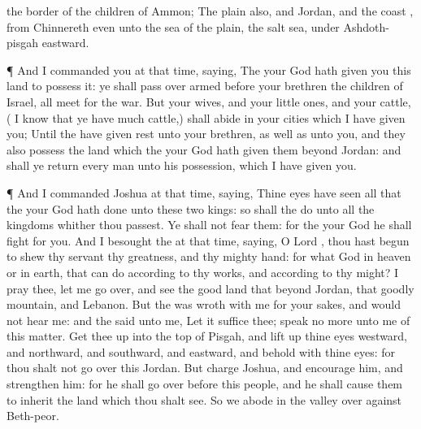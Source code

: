{{} the
border of the
children of
Ammon;
The
plain also, and
Jordan, and the
coast
{}, from
Chinnereth even unto the
sea of the
plain,
{} the
salt
sea, under
Ashdoth-pisgah
eastward.
\par }{\PP {}¶ And I
commanded you at that
time,
saying, The
{} your
God hath
given you this
land to
possess it: ye shall pass
over
armed
before your
brethren the
children of
Israel, all
{}
meet for the
war.
But your
wives, and your little
ones, and your
cattle, ({} I
know that ye have
much
cattle,) shall
abide in your
cities which I have
given you;
Until the
{} have given
rest unto your
brethren, as well as unto you, and
{} they also
possess the
land which the
{} your
God hath
given them
beyond
Jordan: and
{} shall ye
return every
man unto his
possession, which I have
given you.
\par }{\PP {}¶ And I
commanded
Joshua at that
time,
saying, Thine
eyes have
seen all that the
{} your
God hath
done unto these
two
kings: so shall the
{}
do unto all the
kingdoms whither thou
passest.
Ye shall not
fear them: for the
{} your
God he shall
fight for you.
And I
besought the
{} at that
time,
saying,
O
Lord
{}, thou hast
begun to
shew thy
servant thy
greatness, and thy
mighty
hand: for what
God
{} in
heaven or in
earth, that can
do according to thy
works, and according to thy
might?
I pray thee, let me go
over, and
see the
good
land that
{}
beyond
Jordan, that
goodly
mountain, and
Lebanon.
But the
{} was
wroth with me for your sakes, and would not
hear me: and the
{}
said unto me, Let it
suffice thee;
speak no
more unto me of this
matter.
Get thee
up into the
top of
Pisgah, and lift
up thine
eyes
westward, and
northward, and
southward, and
eastward, and
behold
{} with thine
eyes: for thou shalt not go
over this
Jordan.
But
charge
Joshua, and
encourage him, and
strengthen him: for he shall go
over
before this
people, and he shall cause them to
inherit the
land which thou shalt
see.
So we
abode in the
valley over
against
Beth-peor.

}
